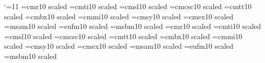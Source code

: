 
\NoRunningHeads
\nopagenumbers
\catcode`\@=11
\font@\twelverm=cmr10 scaled
\font@\twelveit=cmti10 scaled
\font@\twelvesl=cmsl10 scaled
\font@\twelvesmc=cmcsc10 scaled
\font@\twelvett=cmtt10 scaled
\font@\twelvebf=cmbx10 scaled
\font@\twelvei=cmmi10 scaled
\font@\twelvesy=cmsy10 scaled
\font@\twelveex=cmex10 scaled
\font@\twelvemsa=msam10 scaled
\font@\twelveeufm=eufm10 scaled
\font@\twelvemsb=msbm10 scaled
\newtoks\twelvepoint@
\font@\fourteenrm=cmr10 scaled
\font@\fourteenit=cmti10 scaled
\font@\fourteensl=cmsl10 scaled
\font@\fourteensmc=cmcsc10 scaled
\font@\fourteentt=cmtt10 scaled
\font@\fourteenbf=cmbx10 scaled
\font@\fourteeni=cmmi10 scaled
\font@\fourteensy=cmsy10 scaled
\font@\fourteenex=cmex10 scaled
\font@\fourteenmsa=msam10 scaled
\font@\fourteeneufm=eufm10 scaled
\font@\fourteenmsb=msbm10 scaled
\newtoks\fourteenpoint@
\def\fourteenpoint{\normalbaselineskip15\p@
 \abovedisplayskip18\p@ plus4.3\p@ minus12.9\p@
 \belowdisplayskip\abovedisplayskip
 \abovedisplayshortskip\z@ plus4.3\p@
 \belowdisplayshortskip10.1\p@ plus4.3\p@ minus5.8\p@
 \textonlyfont@\rm\fourteenrm \textonlyfont@\it\fourteenit
 \textonlyfont@\sl\fourteensl \textonlyfont@\bf\fourteenbf
 \textonlyfont@\smc\fourteensmc \textonlyfont@\tt\fourteentt
 \ifsyntax@ \def\big##1{{\hbox{$\left##1\right.$}}}%
  \let\Big\big \let\bigg\big \let\Bigg\big
 \else
  \textfont\z@=\fourteenrm  \scriptfont\z@=\twelverm  
\scriptscriptfont\z@=\tenrm
  \textfont\@ne=\fourteeni  \scriptfont\@ne=\twelvei  
\scriptscriptfont\@ne=\teni
  \textfont\tw@=\fourteensy \scriptfont\tw@=\twelvesy 
\scriptscriptfont\tw@=\tensy
  \textfont\thr@@=\fourteenex \scriptfont\thr@@=\twelveex
        \scriptscriptfont\thr@@=\twelveex
  \textfont\itfam=\fourteenit \scriptfont\itfam=\twelveit
        \scriptscriptfont\itfam=\twelveit
  \textfont\bffam=\fourteenbf \scriptfont\bffam=\twelvebf
        \scriptscriptfont\bffam=\tenbf
  \setbox\strutbox\hbox{\vrule height12.2\p@ depth5\p@ width\z@}%
  \setbox\strutbox@\hbox{\lower.72\normallineskiplimit\vbox{%
        \kern-\normallineskiplimit\copy\strutbox}}%
 \setbox\z@\vbox{\hbox{$($}\kern\z@}\bigsize@=1.7\ht\z@
 \fi
 \normalbaselines\rm\ex@.2326ex\jot4.3\ex@\the\fourteenpoint@}

